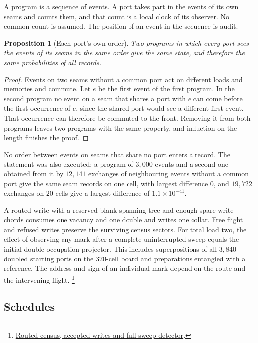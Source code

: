 \documentclass[11pt]{article}
\newtheorem{proposition}[theorem]{Proposition}
\theoremstyle{definition}
\theoremstyle{remark}
\theoremstyle{plain}
\begin{document}
A program is a sequence of events. A port takes part in the events of its
own seams and counts them, and that count is a local clock of its observer.
No common count is assumed. The position of an event in the sequence is
audit.

\begin{proposition}[Each port's own order]
\label{prop:order}
Two programs in which every port sees the events of its seams in the same
order give the same state, and therefore the same probabilities of all
records.
\end{proposition}

\begin{proof}
Events on two seams without a common port act on different loads and
memories and commute. Let $e$ be the first event of the first program. In
the second program no event on a seam that shares a port with $e$ can come
before the first occurrence of $e$, since the shared port would see a
different first event. That occurrence can therefore be
commuted to the front. Removing it from both programs leaves two programs
with the same property, and induction on the length finishes the proof.
\end{proof}

No order between events on seams that share no port enters a record.
The statement was also executed: a program of $3{,}000$ events and a
second one obtained from it by $12{,}141$ exchanges of neighbouring events
without a common port give the same seam records on one cell, with largest
difference $0$, and $19{,}722$ exchanges on $20$ cells give a largest
difference of $1.1\times10^{-41}$.

A routed write with a reserved blank spanning tree and enough spare
write chords consumes one vacancy and one double and writes one collar.
Free flight and refused writes preserve the surviving census sectors.
For total load two, the effect of observing any mark after a complete
uninterrupted sweep equals the initial double-occupation projector.
This includes superpositions of all $3{,}840$ doubled starting ports on
the $320$-cell board and preparations entangled with a reference.
The address and sign of an individual mark depend on the route and
the intervening flight.%
\footnote{\href{https://github.com/FloatingPragma/observer-patch-holography/tree/main/model/experiments/interval_echo_consensus/routed_counts}{Routed census, accepted writes and full-sweep detector}.}

\subsection{Schedules}
\end{document}
